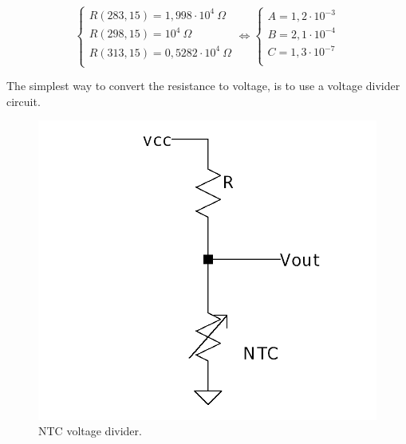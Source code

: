 \documentclass[12pt]{article}
\begin{document}
    \begin{equation}
        \begin{cases}
        
            R( 283,15 ) = 1,998\cdot 10^4 ~\Omega \\
            R( 298,15 ) = 10^4 ~\Omega\\
            R( 313,15 ) = 0,5282 \cdot 10^4 ~\Omega\\
        
        \end{cases}
        \Leftrightarrow
        \begin{cases}
            A = 1,2 \cdot 10^{-3}\\
            B = 2,1 \cdot 10^{-4}\\
            C = 1,3 \cdot 10^{-7}\\
        
        \end{cases}
    \end{equation}

    The simplest way to convert the resistance to voltage, is to use a voltage divider circuit.


   \begin{figure}[H] 
        \centering
        \includegraphics*[scale = 0.25]{images/voltagedivider.png}
        \caption{NTC voltage divider.}
        \label{wrap-fig:1}
    \end{figure}
\end{document}
